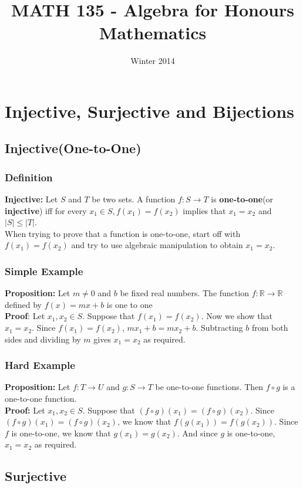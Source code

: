 \documentclass[12pt]{report}
\title{MATH 135 - Algebra for Honours Mathematics}
\author{}
\date{Winter 2014}
\begin{document}
\maketitle
\tableofcontents

\chapter{Injective, Surjective and Bijections}
	\section{Injective(One-to-One)}
		\subsection{Definition}
			\textbf{Injective:} Let $S$ and $T$ be two sets. A function $f: S \rightarrow T$ is \textbf{one-to-one}(or \textbf{injective}) iff for every $x_1 \in S, f(x_1) = f(x_2)$ implies that $x_1 = x_2$ and $|S| \leq |T|$. \\
			When trying to prove that a function is one-to-one, start off with $f(x_1) = f(x_2)$ and try to use algebraic manipulation to obtain $x_1 = x_2$. 
		\subsection{Simple Example}
			\textbf{Proposition:} Let $m \neq 0$ and $b$ be fixed real numbers. The function $f: \mathbb{R} \rightarrow \mathbb{R}$ defined by $f(x) = mx + b$ is one to one\\
			\textbf{Proof}: Let $x_1, x_2 \in S$. Suppose that $f(x_1) = f(x_2)$. Now we show that $x_1 = x_2$. Since $f(x_1) = f(x_2)$, $mx_1 + b = mx_2 + b$. Subtracting $b$ from both sides and dividing by $m$ gives $x_1 = x_2$ as required.
		\subsection{Hard Example}
			\textbf{Proposition:} Let $f: T \rightarrow U$ and $g:S \rightarrow T$ be one-to-one functions. Then $f \circ g$ is a one-to-one function.\\
			\textbf{Proof:} Let $x_1, x_2 \in S$. Suppose that $(f \circ g)(x_1) = (f \circ g)(x_2)$. Since $(f \circ g)(x_1) = (f \circ g)(x_2)$, we know that $f(g(x_1)) = f(g(x_2))$. Since $f$ is one-to-one, we know that $g(x_1) = g(x_2)$. And since $g$ is one-to-one, $x_1 = x_2$ as required. 

	\section{Surjective}
\end{document}
